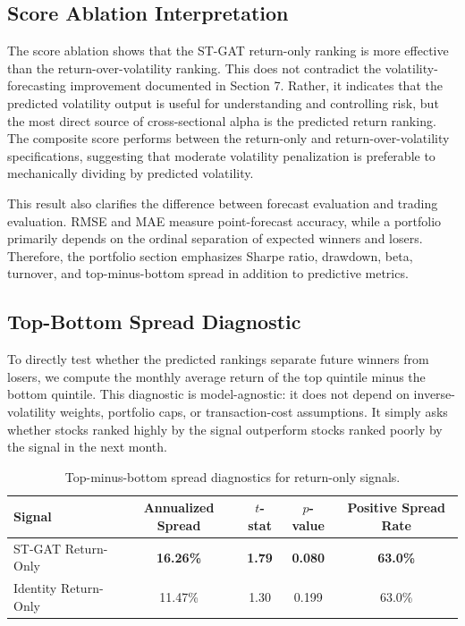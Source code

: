 \documentclass[11pt, a4paper]{article}
\begin{document}
\subsection{Score Ablation Interpretation}
The score ablation shows that the ST-GAT return-only ranking is more effective than the return-over-volatility ranking. This does not contradict the volatility-forecasting improvement documented in Section 7. Rather, it indicates that the predicted volatility output is useful for understanding and controlling risk, but the most direct source of cross-sectional alpha is the predicted return ranking. The composite score performs between the return-only and return-over-volatility specifications, suggesting that moderate volatility penalization is preferable to mechanically dividing by predicted volatility.

This result also clarifies the difference between forecast evaluation and trading evaluation. RMSE and MAE measure point-forecast accuracy, while a portfolio primarily depends on the ordinal separation of expected winners and losers. Therefore, the portfolio section emphasizes Sharpe ratio, drawdown, beta, turnover, and top-minus-bottom spread in addition to predictive metrics.

\subsection{Top-Bottom Spread Diagnostic}
To directly test whether the predicted rankings separate future winners from losers, we compute the monthly average return of the top quintile minus the bottom quintile. This diagnostic is model-agnostic: it does not depend on inverse-volatility weights, portfolio caps, or transaction-cost assumptions. It simply asks whether stocks ranked highly by the signal outperform stocks ranked poorly by the signal in the next month.

\begin{table}[H]
\centering
\caption{Top-minus-bottom spread diagnostics for return-only signals.}
\label{tab:top_bottom_spread}
\vspace{0.2cm}
\renewcommand{\arraystretch}{1.25}
\begin{tabular}{lcccc}
\toprule
\textbf{Signal} & \textbf{Annualized Spread} & \textbf{$t$-stat} & \textbf{$p$-value} & \textbf{Positive Spread Rate} \\
\midrule
ST-GAT Return-Only & \textbf{16.26\%} & \textbf{1.79} & \textbf{0.080} & \textbf{63.0\%} \\
Identity Return-Only & 11.47\% & 1.30 & 0.199 & 63.0\% \\
\bottomrule
\end{tabular}
\end{table}
\end{document}

